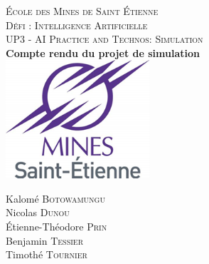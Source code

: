 \begin{titlepage}
	\begin{center}
		
		\textsc{\LARGE École des Mines de Saint Étienne}\\[2cm]
		
		\textsc{\Large Défi : Intelligence Artificielle}\\[1cm]
		\textsc{\Large UP3 - AI Practice and Technos: Simulation}\\[2cm]
		
		{ \huge \bfseries Compte rendu du projet de simulation}
		\\[1cm]
		\includegraphics[width=0.4\textwidth]{image/logo_mines.png}
		\\[2cm]
		
		\begin{minipage}{0.8\textwidth}
			\begin{flushleft} \large
				Kalomé \textsc{Botowamungu}\\[0.2cm]
				Nicolas \textsc{Dunou}\\[0.2cm]
				Étienne-Théodore \textsc{Prin}\\[0.2cm]
				Benjamin \textsc{Tessier}\\[0.2cm]
				Timothé \textsc{Tournier}\\
			\end{flushleft}
		\end{minipage}
		
		\vfill
		
	\end{center}
\end{titlepage}